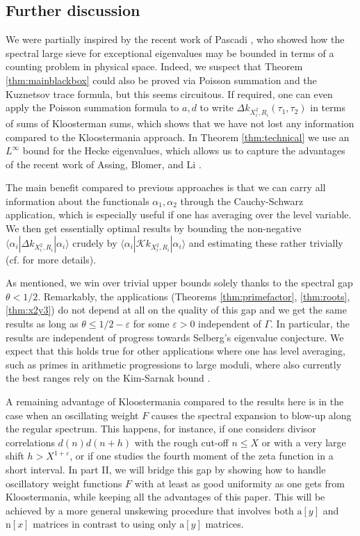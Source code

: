\documentclass[12pt]{amsart}
\theoremstyle{definition}
\theoremstyle{remark}
\numberwithin{equation}{section}
\newcommand{\1}{{\mathbf 1}}
\newcommand{\eps}{\varepsilon}
\renewcommand{\a}{\mathrm{a}}
\newcommand{\n}{\mathrm{n}}
\renewcommand{\n}{\mathrm{n}}
\begin{document}
\subsection{Further discussion}
We were partially inspired by the recent work of Pascadi \cite{pascadi2024large}, who showed how the spectral large sieve for exceptional eigenvalues may be bounded in terms of a counting problem in physical space. Indeed, we suspect that Theorem \ref{thm:mainblackbox} could also be proved via Poisson summation and the Kuznetsov trace formula, but this seems circuitous. If required, one can even apply the Poisson summation formula to $a,d$ to write $\Delta k_{X_i^2,R_i}(\tau_1,\tau_2)$ in terms of sums of Kloosterman sums, which shows that we have not lost any information compared to the Kloostermania approach. In Theorem \ref{thm:technical} we use an $L^\infty$ bound for the Hecke eigenvalues, which allows us to capture the advantages of the recent work of Assing, Blomer, and Li \cite{ABL}.

The main benefit compared to previous approaches is that we can carry all information about the functionals $\alpha_1,\alpha_2$ through the Cauchy-Schwarz application, which is especially useful if one has averaging over the level variable. We then get essentially optimal results by bounding the non-negative $ \langle  \alpha_i| \Delta k_{X_i^2,R_i}| \alpha_i\rangle$ crudely by $ \langle  \alpha_i| \mathcal{K} k_{X_i^2,R_i}| \alpha_i\rangle$ and estimating these rather trivially (cf. \cite{GMquadratic} for more details).

As mentioned, we win over trivial upper bounds solely thanks to the spectral gap $\theta  < 1/2$. Remarkably, the applications (Theorems \ref{thm:primefactor}, \ref{thm:roots}, \ref{thm:x2y3}) do not depend at all on the quality of this gap and we get the same results as long as  $\theta  \leq  1/2- \eps $ for some $\eps >0$ independent of $\Gamma$. In particular, the results are independent of progress towards Selberg's eigenvalue conjecture. We expect that this holds true for other applications where one has level averaging, such as primes in arithmetic progressions to large moduli, where also currently the best ranges \cite{pascadi2024large} rely on the Kim-Sarnak bound \cite{KimSarnak}.

A remaining advantage of Kloostermania compared to the results here is in the case when an oscillating weight $F$ causes the spectral expansion to blow-up along the regular spectrum. This happens, for instance, if one considers divisor correlations $d(n)d(n+h)$ with the rough cut-off $n \leq X$ or with a very large shift $h > X^{1+\eps}$, or if one studies the fourth moment of the zeta function in a short interval. In part II, we will bridge this gap by showing how to handle oscillatory weight functions $F$ with at least as good uniformity as one gets from Kloostermania, while keeping all the advantages of this paper. This will be achieved by a more general unskewing procedure that involves both $\a[y]$ and $\n[x]$ matrices in contrast to using only $\a[y]$ matrices.
\end{document}
